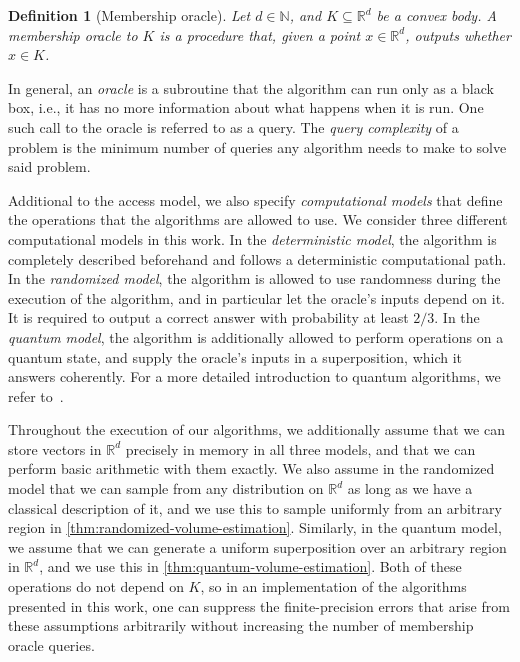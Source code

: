 \documentclass[11pt]{article}
\newtheorem{definition}[theorem]{Definition}
\newcommand{\N}{\ensuremath{\mathbb{N}}}
\newcommand{\R}{\ensuremath{\mathbb{R}}}
\begin{document}
    \begin{definition}[Membership oracle]
        \label{def:membership-oracle}
        Let $d \in \N$, and $K \subseteq \R^d$ be a convex body. A \textit{membership oracle to $K$} is a procedure that, given a point $x \in \R^d$, outputs whether $x \in K$.
    \end{definition}

    In general, an \textit{oracle} is a subroutine that the algorithm can run only as a black box, i.e., it has no more information about what happens when it is run. One such call to the oracle is referred to as a query. The \textit{query complexity} of a problem is the minimum number of queries any algorithm needs to make to solve said problem.

    Additional to the access model, we also specify \textit{computational models} that define the operations that the algorithms are allowed to use. We consider three different computational models in this work. In the \textit{deterministic model}, the algorithm is completely described beforehand and follows a deterministic computational path. In the \textit{randomized model}, the algorithm is allowed to use randomness during the execution of the algorithm, and in particular let the oracle's inputs depend on it. It is required to output a correct answer with probability at least $2/3$. In the \textit{quantum model}, the algorithm is additionally allowed to perform operations on a quantum state, and supply the oracle's inputs in a superposition, which it answers coherently. For a more detailed introduction to quantum algorithms, we refer to~\cite{nielsen2010quantum}.

    Throughout the execution of our algorithms, we additionally assume that we can store vectors in $\R^d$ precisely in memory in all three models, and that we can perform basic arithmetic with them exactly. We also assume in the randomized model that we can sample from any distribution on $\R^d$ as long as we have a classical description of it, and we use this to sample uniformly from an arbitrary region in \cref{thm:randomized-volume-estimation}. Similarly, in the quantum model, we assume that we can generate a uniform superposition over an arbitrary region in $\R^d$, and we use this in \cref{thm:quantum-volume-estimation}. Both of these operations do not depend on $K$, so in an implementation of the algorithms presented in this work, one can suppress the finite-precision errors that arise from these assumptions arbitrarily without increasing the number of membership oracle queries.
\end{document}
